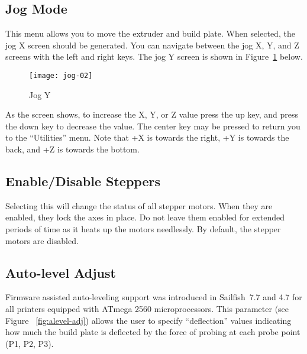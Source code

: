 
\subsection{Jog Mode} \label{sec:jog}

This menu allows you to move the extruder and build plate.  When selected, the jog X screen should be generated.  You can navigate between the jog X, Y, and Z screens with the left and right keys.  The jog Y screen is shown in Figure~\ref{fig:jog} below.

\begin{figure}[!htbp]
  \centering
    \texttt{[image: jog-02]}
    \caption{Jog Y}
  \label{fig:jog}
\end{figure}

As the screen shows, to increase the X, Y, or Z value press the up key, and press the down key to decrease the value.  The center key may be pressed to return you to the ``Utilities'' menu.  Note that +X is towards the right, +Y is towards the back, and +Z is towards the bottom.


\subsection{Enable/Disable Steppers} \label{sec:steppers-enable}

Selecting this will change the status of all stepper motors.  When they are enabled, they lock the axes in place.  Do not leave them enabled for extended periods of time as it heats up the motors needlessly.  By default, the stepper motors are disabled.


\subsection{Auto-level Adjust} \label{sec:alevel-adj}

Firmware assisted auto-leveling support was introduced in Sailfish~7.7 and 4.7 for all printers equipped with ATmega 2560 microprocessors. This parameter (see Figure ~\ref{fig:alevel-adj}) allows the user to specify ``deflection'' values indicating how much the build plate is deflected by the force of probing at each probe point (P1, P2, P3). 

